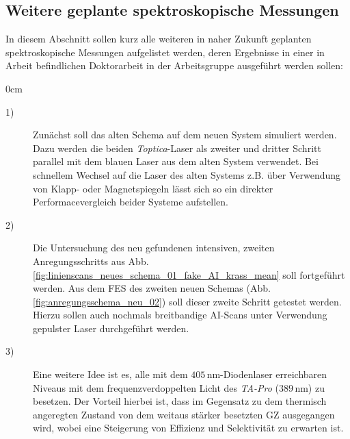 \subsection{Weitere geplante spektroskopische
Messungen}\label{subsec:geplante_messungen}
In diesem Abschnitt sollen kurz alle weiteren in naher Zukunft geplanten
spektroskopische Messungen aufgelistet werden, deren Ergebnisse in einer in
Arbeit befindlichen Doktorarbeit \cite{hakimi:2012:dissertation} in der
Arbeitsgruppe ausgeführt werden sollen:
\begin{setlength}{\leftmargini}{0cm}
	\begin{description}
	\item[1)]Zunächst soll das alten Schema auf dem neuen System simuliert werden. Dazu
		werden die beiden \textit{Toptica}-Laser als zweiter und dritter Schritt
		parallel mit dem blauen Laser aus dem alten System verwendet. Bei schnellem
		Wechsel auf die Laser des alten Systems z.B. über Verwendung von Klapp- oder
		Magnetspiegeln lässt sich so ein direkter Performacevergleich beider Systeme
		aufstellen.
	\item[2)]Die Untersuchung des neu gefundenen intensiven, zweiten
		Anregungsschritts aus Abb.
		\ref{fig:linienscans_neues_schema_01_fake_AI_krass_mean} soll fortgeführt
		werden. Aus dem FES des zweiten neuen Schemas
		(Abb. \ref{fig:anregungsschema_neu_02}) soll dieser zweite Schritt getestet
		werden. Hierzu sollen auch nochmals breitbandige AI-Scans unter Verwendung
		gepulster Laser durchgeführt werden.
	\item[3)]Eine weitere Idee ist es, alle mit dem $405\,$nm-Diodenlaser erreichbaren
		Niveaus mit dem frequenzverdoppelten Licht des \textit{TA-Pro} ($389\,$nm) zu
		besetzen. Der Vorteil hierbei ist, dass im Gegensatz zu dem thermisch angeregten
		Zustand von dem weitaus stärker besetzten GZ ausgegangen wird, wobei eine
		Steigerung von Effizienz und Selektivität zu erwarten ist.
	\end{description}
\end{setlength} 


